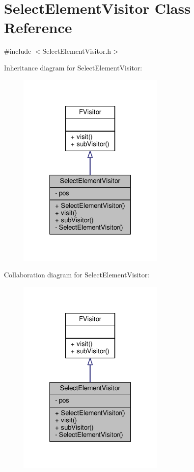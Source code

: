 \hypertarget{classSelectElementVisitor}{}\section{Select\+Element\+Visitor Class Reference}
\label{classSelectElementVisitor}


{\ttfamily \#include $<$Select\+Element\+Visitor.\+h$>$}



Inheritance diagram for Select\+Element\+Visitor\+:
\nopagebreak
\begin{figure}[H]
\begin{center}
\leavevmode
\includegraphics[width=203pt]{classSelectElementVisitor__inherit__graph}
\end{center}
\end{figure}


Collaboration diagram for Select\+Element\+Visitor\+:
\nopagebreak
\begin{figure}[H]
\begin{center}
\leavevmode
\includegraphics[width=203pt]{classSelectElementVisitor__coll__graph}
\end{center}
\end{figure}
